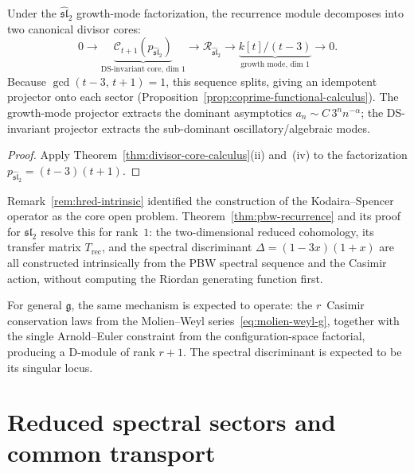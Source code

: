 \begin{corollary}
\ClaimStatusProvedHere
\label{cor:growth-ds-divisor-cores}
Under the \(\widehat{\mathfrak{sl}}_2\) growth-mode factorization,
the recurrence module decomposes into two canonical divisor
cores:
\[
0\longrightarrow
\underbrace{\mathcal C_{t+1}
(p_{\widehat{\mathfrak{sl}}_2})}_{\text{DS-invariant core, dim }1}
\longrightarrow
\mathcal R_{\widehat{\mathfrak{sl}}_2}
\longrightarrow
\underbrace{k[t]/(t{-}3)}_{\text{growth mode, dim }1}
\longrightarrow 0.
\]
Because
\(\gcd(t{-}3,\,
t{+}1)=1\), this sequence splits, giving an idempotent
projector onto each sector
(Proposition~\ref{prop:coprime-functional-calculus}).
The growth-mode projector extracts the dominant asymptotics
\(a_n\sim C\,3^n n^{-\alpha}\);
the DS-invariant projector extracts the sub-dominant
oscillatory/algebraic modes.
\end{corollary}

\begin{proof}
Apply Theorem~\ref{thm:divisor-core-calculus}(ii) and~(iv)
to the factorization
\(p_{\widehat{\mathfrak{sl}}_2}=(t{-}3)(t{+}1)\).
\end{proof}

\begin{remark}
\label{rem:intrinsic-resolution}
Remark~\ref{rem:hred-intrinsic} identified the construction of
the Kodaira--Spencer operator as the core open problem.
Theorem~\ref{thm:pbw-recurrence} and its proof for
\(\mathfrak{sl}_2\) resolve this for rank~\(1\):
the two-dimensional reduced cohomology, its transfer matrix
\(T_{\mathrm{rec}}\), and the spectral discriminant
\(\Delta=(1{-}3x)(1{+}x)\) are all constructed intrinsically
from the PBW spectral sequence and the Casimir action,
without computing the Riordan generating function first.

For general \(\mathfrak g\), the same mechanism is expected to
operate:
the \(r\)~Casimir conservation laws from the Molien--Weyl
series~\eqref{eq:molien-weyl-g}, together with the single
Arnold--Euler constraint from the configuration-space
factorial, producing a D-module of rank \(r{+}1\).
The spectral discriminant is expected to be its singular locus.
\end{remark}

\section{Reduced spectral sectors and common transport}

